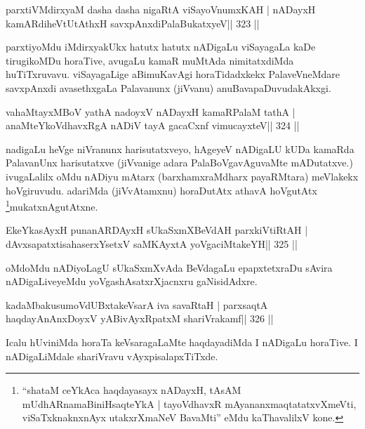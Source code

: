 
\begin{shl}
parxtiVMdirxyaM dasha dasha nigaRtA viSayoVnumxKAH |
nADayxH kamARdiheVtUtAthxH savxpAnxdiPalaBukatxyeV\hfill || 323 ||
\end{shl}

\begin{artha}
parxtiyoMdu iMdirxyakUkx hatutx hatutx nADigaLu viSayagaLa kaDe  tirugikoMDu horaTive, avugaLu kamaR muMtAda nimitatxdiMda huTiTxruvavu. viSayagaLige aBimuKavAgi horaTidadxkekx PalaveVneMdare  \mdash  savxpAnxdi avasethxgaLa Palavanunx (jiVvanu) anuBavapaDuvudakAkxgi.
\end{artha}

\begin{shl}
vahaMtayxMBoV yathA nadoyxV nADayxH kamaRPalaM tathA |
anaMteYkoVdhavxRgA nADiV tayA gacaCxnf vimucayxteV\hfill || 324 ||
\end{shl}

\begin{artha}
nadigaLu heVge niVranunx harisutatxveyo, hAgeyeV nADigaLU kUDa kamaRda 
PalavanUnx harisutatxve (jiVvanige adara PalaBoVgavAguvaMte 
mADutatxve.) ivugaLalilx oMdu nADiyu mAtarx (barxhamxraMdharx 
payaRMtara) meVlakekx hoVgiruvudu. adariMda (jiVvAtamxnu) horaDutAtx 
athavA hoVgutAtx \footnote{``shataM ceYkAca haqdayasayx nADayxH, 
tAsAM mUdhARnamaBiniHsaqteYkA | tayoVdhavxR mAyananxmaqtatatxvXmeVti, 
viSaTxknaknxnAyx utakxrXmaNeV BavaMti'' eMdu kaThavalilxV kone.}mukatxnAgutAtxne.
\end{artha}

\begin{shl}
EkeYkasAyxH punanARDAyxH sUkaSxmXBeVdAH parxkiVtiRtAH |
dAvxsapatxtisahaserxYsetxV saMKAyxtA yoVgaciMtakeYH\hfill || 325 ||
\end{shl}

\begin{artha}oMdoMdu nADiyoLagU sUkaSxmXvAda BeVdagaLu epapxtetxraDu sAvira nADigaLiveyeMdu yoVgashAsatxrXjacnxru gaNisidAdxre.
\end{artha}


\begin{shl}
kadaMbakusumoVdUBxtakeVsarA iva savaRtaH |
parxsaqtA haqdayAnAnxDoyxV yABivAyxRpatxM shariVrakamf\hfill || 326 ||
\end{shl}

\begin{artha}
Icalu hUviniMda horaTa keVsaragaLaMte haqdayadiMda I nADigaLu horaTive. I nADigaLiMdale shariVravu vAyxpisalapxTiTxde.
\end{artha}

